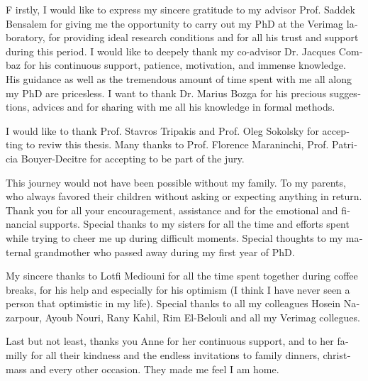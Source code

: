 \begin{acknowledgements}
\begin{otherlanguage}{french}
\ackfont
\large
\lettrine[lines=3,loversize=0.2]{\color{BrickRed}F}{} irstly, I would like to express my 
sincere gratitude to my advisor Prof. Saddek Bensalem for giving me the opportunity to carry 
out my PhD at the Verimag laboratory, for providing ideal research
conditions and for all his trust and support during this period. 
I would like to deepely thank my co-advisor Dr. Jacques Combaz for his continuous support, 
patience, motivation, and immense knowledge. His guidance as well as the tremendous 
amount of time spent with me all along my PhD are pricesless.
I want to thank Dr. Marius Bozga for his precious suggestions, advices and for 
sharing with me all his knowledge in formal methods.

I would like to thank Prof. Stavros Tripakis and Prof. Oleg Sokolsky for accepting to reviw this
thesis. Many thanks to Prof. Florence Maraninchi, Prof. Patricia Bouyer-Decitre for accepting 
to be part of the jury.
  
This journey would not have been possible without my family. To my parents, who always favored
their children without asking or expecting anything in return. Thank you for all your 
encouragement, assistance and for the emotional and financial supports. Special thanks to my 
sisters for all the time and efforts spent while trying to cheer me up during difficult moments.
Special thoughts to my maternal grandmother who passed away during my first year of PhD.
  
My sincere thanks to Lotfi Mediouni for all the time spent together during coffee breaks, for
his help and especially for his optimism (I think I have never seen a person that optimistic
in my life). Special thanks to all my colleagues Hosein Nazarpour, Ayoub Nouri, Rany Kahil, 
Rim El-Belouli and all my Verimag collegues.

Last but not least, thanks you Anne for her continuous support, and to her familly
for all their kindness and the endless invitations to family dinners, christmass and every other
occasion. They made me feel I am home.
     
\end{otherlanguage}
\end{acknowledgements}

